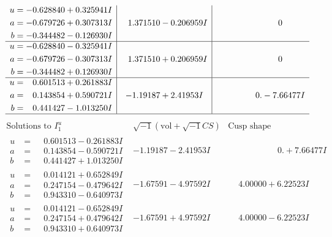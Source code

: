 \documentclass[1p]{elsarticle_modified}
\theoremstyle{definition}
\newcommand{\I}{\sqrt{-1}}
\begin{document}
$$\begin{array}{c|c|c}
\begin{aligned}
u &= -0.628840 + 0.325941 I \\
a &= -0.679726 + 0.307313 I \\
b &= -0.344482 - 0.126930 I\end{aligned}
 & \phantom{-}1.371510 - 0.206959 I & \phantom{-0.000000 } 0 \\ \hline\begin{aligned}
u &= -0.628840 - 0.325941 I \\
a &= -0.679726 - 0.307313 I \\
b &= -0.344482 + 0.126930 I\end{aligned}
 & \phantom{-}1.371510 + 0.206959 I & \phantom{-0.000000 } 0 \\ \hline\begin{aligned}
u &= \phantom{-}0.601513 + 0.261883 I \\
a &= \phantom{-}0.143854 + 0.590721 I \\
b &= \phantom{-}0.441427 - 1.013250 I\end{aligned}
 & -1.19187 + 2.41953 I & \phantom{-0.000000 } 0. - 7.66477 I\\
 \hline 
 \end{array}$$\newpage$$\begin{array}{c|c|c}  
\text{Solutions to }I^u_{1}& \I (\text{vol} + \sqrt{-1}CS) & \text{Cusp shape}\\
 \hline 
\begin{aligned}
u &= \phantom{-}0.601513 - 0.261883 I \\
a &= \phantom{-}0.143854 - 0.590721 I \\
b &= \phantom{-}0.441427 + 1.013250 I\end{aligned}
 & -1.19187 - 2.41953 I & \phantom{-0.000000 -}0. + 7.66477 I \\ \hline\begin{aligned}
u &= \phantom{-}0.014121 + 0.652849 I \\
a &= \phantom{-}0.247154 - 0.479642 I \\
b &= \phantom{-}0.943310 - 0.640973 I\end{aligned}
 & -1.67591 - 4.97592 I & \phantom{-}4.00000 + 6.22523 I \\ \hline\begin{aligned}
u &= \phantom{-}0.014121 - 0.652849 I \\
a &= \phantom{-}0.247154 + 0.479642 I \\
b &= \phantom{-}0.943310 + 0.640973 I\end{aligned}
 & -1.67591 + 4.97592 I & \phantom{-}4.00000 - 6.22523 I \\ \hline\begin{aligned}

\end{aligned}
\end{array}$$
\end{document}
